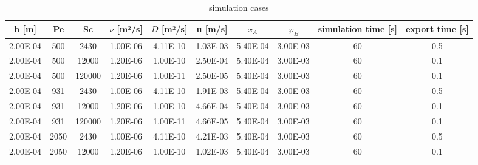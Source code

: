 \documentclass[../thesis.tex]{subfiles}
\begin{document}
\begin{landscape}
	\begin{table}[htb]
		\centering
		\caption{simulation cases}
		\label{tab: cases}
		\small
		\begin{tabular}{cccccccccc}
			\textbf{h [m]} & \textbf{Pe} & \textbf{Sc} & \textbf{$\nu$ [m²/s]} & \textbf{$D$ [m²/s]} & \textbf{u [m/s]} & \textbf{$x_A$} & \textbf{$\varphi_B$} & \textbf{simulation time [s]} & \textbf{export time [s]} \\
			\hline
			2.00E-04            & 500         & 2430        & 1.00E-06               & 4.11E-10               & 1.03E-03              & 5.40E-04      & 3.00E-03        & 60                            & 0.5                       \\
			2.00E-04            & 500         & 12000       & 1.20E-06               & 1.00E-10               & 2.50E-04              & 5.40E-04      & 3.00E-03        & 60                            & 0.1                       \\
			2.00E-04            & 500         & 120000      & 1.20E-06               & 1.00E-11               & 2.50E-05              & 5.40E-04      & 3.00E-03        & 60                            & 0.1                       \\
			2.00E-04            & 931         & 2430        & 1.00E-06               & 4.11E-10               & 1.91E-03              & 5.40E-04      & 3.00E-03        & 60                            & 0.5                       \\
			2.00E-04            & 931         & 12000       & 1.20E-06               & 1.00E-10               & 4.66E-04              & 5.40E-04      & 3.00E-03        & 60                            & 0.1                       \\
			2.00E-04            & 931         & 120000      & 1.20E-06               & 1.00E-11               & 4.66E-05              & 5.40E-04      & 3.00E-03        & 60                            & 0.1                       \\
			2.00E-04            & 2050        & 2430        & 1.00E-06               & 4.11E-10               & 4.21E-03              & 5.40E-04      & 3.00E-03        & 60                            & 0.5                       \\
			2.00E-04            & 2050        & 12000       & 1.20E-06               & 1.00E-10               & 1.02E-03              & 5.40E-04      & 3.00E-03        & 60                            & 0.1                       \\

\end{tabular}
\end{table}
\end{landscape}
\end{document}
